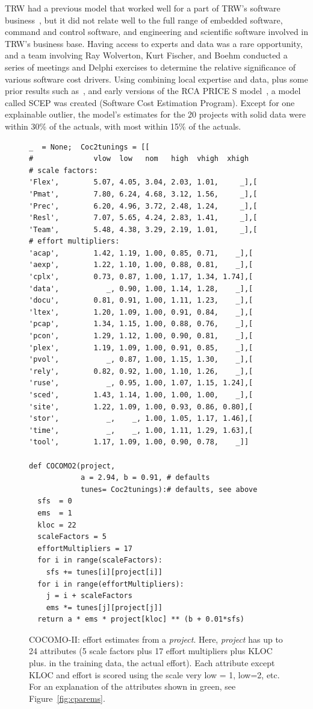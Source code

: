 \documentclass{sig-alternate}
\newcommand{\fig}[1]{Figure~\ref{fig:#1}}
\begin{document}
TRW had a previous model that worked well for a part
of TRW's software business~\cite{wol74}, but it
did not relate well to the full range of embedded
software, command and control software, and
engineering and scientific software involved in
TRW's business base.  Having access to experts and
data was a rare opportunity, and a team involving
Ray Wolverton, Kurt Fischer, and Boehm conducted a
series of meetings and Delphi exercises to determine
the relative significance of various software cost
drivers. Using combining local expertise  and data, plus some prior results 
such as~\cite{putnam76,black77,herd77,watson77},  and early versions of the RCA
PRICE S model~\cite{frei79}, a model called SCEP was created (Software Cost
Estimation Program).
Except for
one explainable outlier, the model's estimates for
the 20 projects with solid data were within 30\% of
the actuals, with most within 15\% of the actuals.

\begin{figure}[!t]
\begin{lstlisting}
_  = None;  Coc2tunings = [[
#              vlow  low   nom   high  vhigh  xhigh   
# scale factors:
'Flex',        5.07, 4.05, 3.04, 2.03, 1.01,     _],[
'Pmat',        7.80, 6.24, 4.68, 3.12, 1.56,     _],[
'Prec',        6.20, 4.96, 3.72, 2.48, 1.24,     _],[
'Resl',        7.07, 5.65, 4.24, 2.83, 1.41,     _],[
'Team',        5.48, 4.38, 3.29, 2.19, 1.01,     _],[
# effort multipliers:        
'acap',        1.42, 1.19, 1.00, 0.85, 0.71,    _],[
'aexp',        1.22, 1.10, 1.00, 0.88, 0.81,    _],[
'cplx',        0.73, 0.87, 1.00, 1.17, 1.34, 1.74],[
'data',           _, 0.90, 1.00, 1.14, 1.28,    _],[
'docu',        0.81, 0.91, 1.00, 1.11, 1.23,    _],[
'ltex',        1.20, 1.09, 1.00, 0.91, 0.84,    _],[
'pcap',        1.34, 1.15, 1.00, 0.88, 0.76,    _],[ 
'pcon',        1.29, 1.12, 1.00, 0.90, 0.81,    _],[
'plex',        1.19, 1.09, 1.00, 0.91, 0.85,    _],[ 
'pvol',           _, 0.87, 1.00, 1.15, 1.30,    _],[
'rely',        0.82, 0.92, 1.00, 1.10, 1.26,    _],[
'ruse',           _, 0.95, 1.00, 1.07, 1.15, 1.24],[
'sced',        1.43, 1.14, 1.00, 1.00, 1.00,    _],[ 
'site',        1.22, 1.09, 1.00, 0.93, 0.86, 0.80],[ 
'stor',           _,    _, 1.00, 1.05, 1.17, 1.46],[
'time',           _,    _, 1.00, 1.11, 1.29, 1.63],[
'tool',        1.17, 1.09, 1.00, 0.90, 0.78,    _]]

def COCOMO2(project, 
            a = 2.94, b = 0.91, # defaults
            tunes= Coc2tunings):# defaults, see above
  sfs  = 0
  ems  = 1 
  kloc = 22
  scaleFactors = 5 
  effortMultipliers = 17
  for i in range(scaleFactors):
    sfs += tunes[i][project[i]]
  for i in range(effortMultipliers):
    j = i + scaleFactors
    ems *= tunes[j][project[j]] 
  return a * ems * project[kloc] ** (b + 0.01*sfs) 
\end{lstlisting}
\caption{COCOMO-II: effort estimates from a {\em project}.
Here, {\em project} has up to 24 attributes  (5 scale
factors plus 17 effort multipliers plus KLOC plus. in the training data, the actual effort).
Each attribute except KLOC and effort is scored
using the scale very low = 1, low=2, etc.
For an explanation of the attributes shown in
green, see \fig{cparems}.}\label{fig:coc2}
\end{figure}
\end{document}
